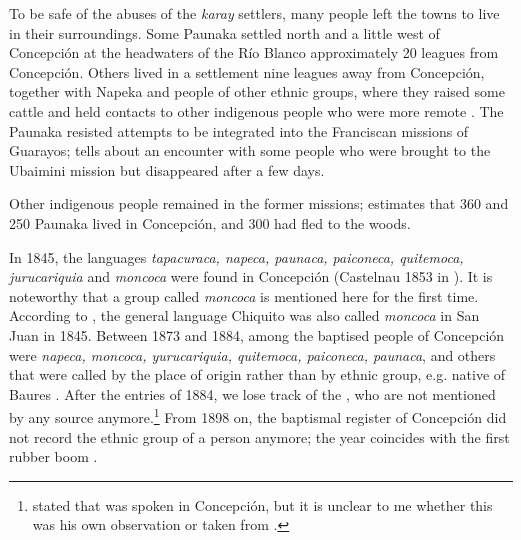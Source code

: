 To be safe of the abuses of the \textit{karay} settlers, many people left the towns to live in their surroundings. Some Paunaka settled north and a little west of Concepción at the headwaters of the Río Blanco approximately 20 leagues from Concepción. Others lived in a settlement nine leagues away from Concepción, together with Napeka and people of other ethnic groups, where they raised some cattle and held contacts to other indigenous people who were more remote \citep[284--285]{Cardus1886}. The Paunaka resisted attempts to be integrated into the Franciscan missions of Guarayos; \citet[285]{Cardus1886} tells about an encounter with some people who were brought to the Ubaimini mission but disappeared after a few days.

Other indigenous people remained in the former missions; \citet[275]{Orbigny1839} %
estimates that 360  and 250 Paunaka lived in Concepción, and 300 had fled to the woods.
  
In 1845, the languages  \textit{tapacuraca, napeca, paunaca, paiconeca, quitemoca, jurucariquia} and \textit{moncoca} were found in Concepción (Castelnau 1853 in \citealt[247]{Martinez2015}). It is noteworthy that a group called \textit{moncoca} is mentioned here for the first time. According to \citet[247]{Martinez2015}, the general language Chiquito was also called \textit{moncoca} in San Juan in 1845.
Between 1873 and 1884, among the baptised people of Concepción were \textit{napeca, moncoca, yurucariquia, quitemoca, paiconeca, paunaca}, and others that were called by the place of origin rather than by ethnic group, e.g. native of Baures \citep[9--10]{Villalta2012}. After the entries of 1884, we lose track of the , who are not mentioned by any source anymore.\footnote{\citet[308]{Cardus1886} stated that  was spoken in Concepción, but it is unclear to me whether this was his own observation or taken from \citet[]{Orbigny1839_2}.} From 1898 on, the baptismal register of Concepción did not record the ethnic group of a person anymore; the year coincides with the first rubber boom \citep[9--10]{Villalta2012}.

